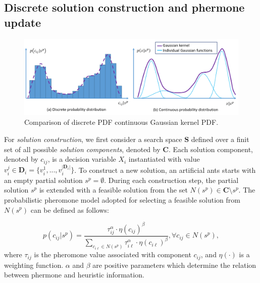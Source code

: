 \subsection{Discrete solution construction and phermone update}

\begin{figure}
\centering
\includegraphics[width=\textwidth]{ACOR_gaussianKernel}
\caption{Comparison of discrete PDF continuous Gaussian kernel PDF.}\label{fig:ACOR_gaussianKernel}
\end{figure}


For \textit{solution construction}, 
we first consider a search space $\boldsymbol{S}$ defined over a finit set of all possible \textit{solution components}, 
denoted by $\boldsymbol{C}$.
Each solution component, denoted by $c_{ij}$, is a decision variable $X_i$ instantiated with value $v^{j}_{i} \in \boldsymbol{D}_i = \{ v^{1}_{i}, ..., v^{|\boldsymbol{D}_i|}_{i}\}$.
To construct a new solution, an artificial ants starts with an empty partial solution $s^{p} = \emptyset$.
During each construction step, the partial solution $s^{p}$ is extended with a feasible solution from the set $N(s^{p}) \in \boldsymbol{C} \setminus s^{p}$.
The probabilistic pheromone model adopted for selecting a feasible solution from $N(s^{p})$ can be defined as follows:

\begin{displaymath}
p(c_{ij}|s^p) = \frac{\tau^{\alpha}_{ij} \cdot \eta(c_{ij})^{\beta}} 
                     {\sum_{c_{i\ell}\in N(s^{p})} \tau^{\alpha}_{i\ell} \cdot \eta(c_{i\ell})^{\beta} },  \forall c_{ij} \in N(s^{p}),
\end{displaymath}
where $\tau_{ij}$ is the pheromone value associated with component $c_{ij}$, and $\eta(\cdot)$ is a weighting function. 
$\alpha$ and $\beta$ are positive parameters which determine the relation between phermone and heuristic information.

